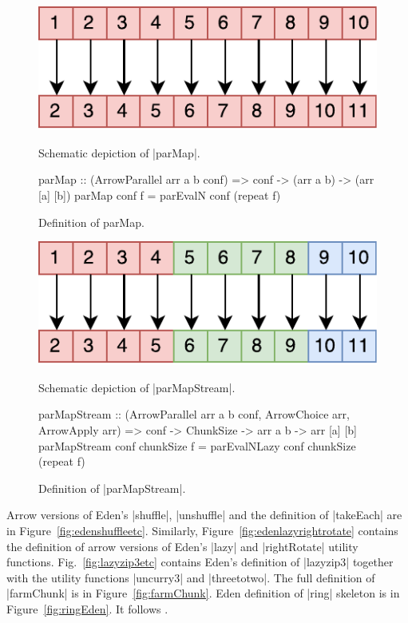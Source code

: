 \begin{figure}[thb]
\includegraphics[scale=0.7]{images/parMap}
\caption{Schematic depiction of |parMap|.}
\label{fig:parMapImg}

\begin{code}
parMap :: (ArrowParallel arr a b conf) => conf -> (arr a b) -> (arr [a] [b])
parMap conf f = parEvalN conf (repeat f)
\end{code}
\caption{Definition of parMap.}
\label{fig:parMap}

\includegraphics[scale=0.7]{images/parMapStream}
\caption{Schematic depiction of |parMapStream|.}
\label{fig:parMapStreamImg}

\begin{code}
parMapStream :: (ArrowParallel arr a b conf, ArrowChoice arr, ArrowApply arr) =>
	conf -> ChunkSize -> arr a b -> arr [a] [b]
parMapStream conf chunkSize f = parEvalNLazy conf chunkSize (repeat f)
\end{code}
\caption{Definition of |parMapStream|.}
\label{fig:parMapStream}
\end{figure}

Arrow versions of Eden's |shuffle|, |unshuffle| and the definition of |takeEach| are in Figure~\ref{fig:edenshuffleetc}. Similarly, Figure~\ref{fig:edenlazyrightrotate} contains the definition of arrow versions of Eden's |lazy| and |rightRotate| utility functions. Fig.~\ref{fig:lazyzip3etc} contains Eden's definition of |lazyzip3| together with the utility functions |uncurry3| and |threetotwo|.
The full definition of |farmChunk| is in Figure~\ref{fig:farmChunk}.
Eden definition of |ring| skeleton is in Figure~\ref{fig:ringEden}. It
follows \citet{Loogen2012}.


